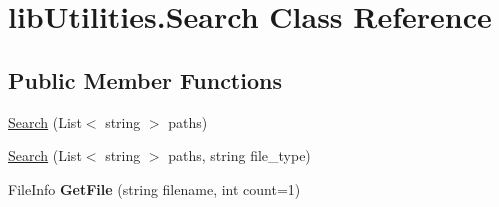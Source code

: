 \hypertarget{classlib_utilities_1_1_search}{\section{lib\+Utilities.\+Search Class Reference}
\label{classlib_utilities_1_1_search}
}
\subsection*{Public Member Functions}
\begin{DoxyCompactItemize}
\item 
\hyperlink{classlib_utilities_1_1_search_a38151bc96b7ef38f4949c3d9e71dca26}{Search} (List$<$ string $>$ paths)
\item 
\hyperlink{classlib_utilities_1_1_search_a80b62afe8e87665165917cd4574aa2d6}{Search} (List$<$ string $>$ paths, string file\+\_\+type)
\item 
\hypertarget{classlib_utilities_1_1_search_a76295ac2747bf9a06a9db92c91c486e9}{File\+Info {\bfseries Get\+File} (string filename, int count=1)}\label{classlib_utilities_1_1_search_a76295ac2747bf9a06a9db92c91c486e9}

\end{DoxyCompactItemize}


